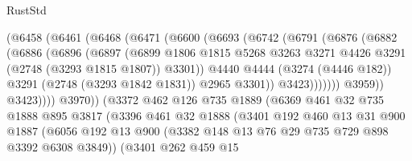 \begin{lexlean}{RustStd}
\begin{coremodule}
                        (@6458
                          (@6461
                            (@6468
                              (@6471
                                (@6600
                                  (@6693
                                    (@6742
                                      (@6791
                                        (@6876
                                          (@6882
                                            (@6886
                                              (@6896
                                                (@6897
                                                  (@6899
                                                    @1806
                                                    @1815
                                                    @5268
                                                    @3263
                                                    @3271
                                                    @4426
                                                    @3291
                                                    (@2748 (@3293 @1815 @1807))
                                                    @3301))
                                                @4440
                                                @4444
                                                (@3274 (@4446 @182))
                                                @3291
                                                (@2748 (@3293 @1842 @1831))
                                                @2965
                                                @3301))
                                            @3423)))))))
                              @3959))
                          @3423))))
                  @3970))
              (@3372
                @462
                @126
                @735
                @1889
                (@6369
                  @461
                  @32
                  @735
                  @1888
                  @895
                  @3817
                  (@3396
                    @461
                    @32
                    @1888
                    (@3401
                      @192
                      @460
                      @13
                      @31
                      @900
                      @1887
                      (@6056
                        @192
                        @13
                        @900
                        (@3382 @148 @13 @76 @29 @735 @729 @898 @3392 @6308 @3849))
                      (@3401
                        @262
                        @459
                        @15

\end{coremodule}
\end{lexlean}
